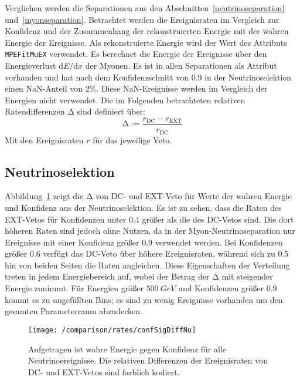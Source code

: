 Verglichen werden die Separationen aus den Abschnitten~\ref{neutrinoseparation} und~\ref{myonseparation}.
Betrachtet werden die Ereignisraten im Vergleich zur Konfidenz und der Zusammenhang der rekonstruierten Energie mit der wahren Energie der Ereignisse.
Als rekonstruierte Energie wird der Wert des Attributs \texttt{MPEFitMuEX} verwendet.
Es berechnet die Energie der Ereignisse über den Energieverlust $\mathrm{d}E/\mathrm{d}x$ der Myonen.
Es ist in allen Separationen als Attribut vorhanden und hat nach dem Konfidenzschnitt von 0.9 in der Neutrinoselektion einen NaN-Anteil von 2\%. 
Diese NaN-Ereignisse werden im Vergleich der Energien nicht verwendet.
Die im Folgenden betrachteten relativen Ratendifferenzen $\mathrm{Δ}$ sind definiert über:
\begin{equation}
    \mathrm{Δ} := \frac{r_\text{DC}-r_\text{EXT}}{r_\text{DC}}
\end{equation}
Mit den Ereignisraten $r$ für das jeweilige Veto.


\subsection{Neutrinoselektion}

Abbildung~\ref{fig:confDiffSig} zeigt die $\mathrm{Δ}$ von DC- und EXT-Veto für Werte der wahren Energie und Konfidenz aus der Neutrinoselektion. 
Es ist zu sehen, dass die Raten des EXT-Vetos für Konfidenzen unter 0.4 größer als die des DC-Vetos sind.
Die dort höheren Raten sind jedoch ohne Nutzen, da in der Myon-Neutrinoseparation nur Ereignisse mit einer Konfidenz größer 0.9 verwendet werden.
Bei Konfidenzen größer 0.6 verfügt das DC-Veto über höhere Ereignisraten, während sich zu 0.5 hin von beiden Seiten die Raten angleichen.
Diese Eigenschaften der Verteilung treten in jedem Energiebereich auf, wobei der Betrag der $\mathrm{Δ}$ mit steigender Energie zunimmt.
Für Energien größer $\SI{500}{GeV}$ und Konfidenzen größer 0.9 kommt es zu ungefüllten Bins; es sind zu wenig Ereignisse vorhanden um den gesamten Parameterraum abzudecken.
\begin{figure}
\begin{center}
    \texttt{[image: /comparison/rates/confSigDiffNu]}
\end{center}
\vspace{-2em}
\caption{Aufgetragen ist wahre Energie gegen Konfidenz für alle Neutrinoereignisse. Die relativen Differenzen der Ereignisraten von DC- und EXT-Vetos sind farblich kodiert.}
\label{fig:confDiffSig}
\end{figure}

